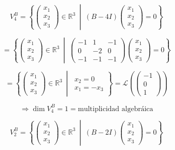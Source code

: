 \documentclass[12pt]{article}
\begin{document}
\begin{ejercicio}[2 puntos]
		
		\medskip
		
		
		\[
		V_4^B = \left\{
		\begin{pmatrix}
			x_1 \\
			x_2 \\
			x_3
		\end{pmatrix}
		\in \mathbb{R}^3 \ \middle| \
		(B - 4I)
		\begin{pmatrix}
			x_1 \\
			x_2 \\
			x_3
		\end{pmatrix}
		= 0
		\right\}
		\]
		
		\[
		= \left\{
		\begin{pmatrix}
			x_1 \\
			x_2 \\
			x_3
		\end{pmatrix}
		\in \mathbb{R}^3 \ \middle| \
		\begin{pmatrix}
			-1 & 1 & -1 \\
			0 & -2 & 0 \\
			-1 & -1 & -1
		\end{pmatrix}
		\begin{pmatrix}
			x_1 \\
			x_2 \\
			x_3
		\end{pmatrix}
		= 0
		\right\}
		\]
		
		\[
		= \left\{
		\begin{pmatrix}
			x_1 \\
			x_2 \\
			x_3
		\end{pmatrix}
		\in \mathbb{R}^3 \ \middle| \
		\begin{array}{l}
			x_2 = 0 \\
			x_1 = -x_3
		\end{array}
		\right\}
		= \mathcal{L} \left( \begin{pmatrix} -1 \\ 0 \\ 1 \end{pmatrix} \right)
		\]
		
		\[
		\Rightarrow \dim V_4^B = 1 = \text{multiplicidad algebráica}
		\]
		\medskip
		
		
		\[
		V_2^B = \left\{
		\begin{pmatrix}
			x_1 \\
			x_2 \\
			x_3
		\end{pmatrix}
		\in \mathbb{R}^3 \ \middle| \ 
		(B - 2I)
		\begin{pmatrix}
			x_1 \\
			x_2 \\
			x_3
		\end{pmatrix}
		= 0
		\right\}
		\]
		

\end{ejercicio}
\end{document}
